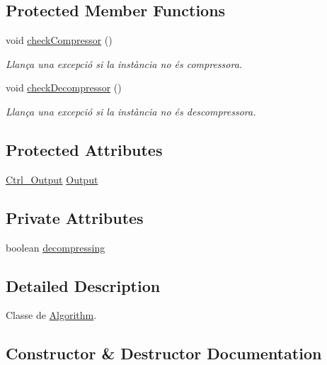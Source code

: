 \subsection*{Protected Member Functions}
\begin{DoxyCompactItemize}
\item 
void \hyperlink{classdomini_1_1algorithm_1_1Algorithm_a070b7e7dcc453b03751d265beae5306c}{check\+Compressor} ()
\begin{DoxyCompactList}\small\item\em Llança una excepció si la instància no és compressora. \end{DoxyCompactList}\item 
void \hyperlink{classdomini_1_1algorithm_1_1Algorithm_a6b738342cc7169893fa60d593f5a13db}{check\+Decompressor} ()
\begin{DoxyCompactList}\small\item\em Llança una excepció si la instància no és descompressora. \end{DoxyCompactList}\end{DoxyCompactItemize}
\subsection*{Protected Attributes}
\begin{DoxyCompactItemize}
\item 
\hyperlink{classpersistencia_1_1output_1_1Ctrl__Output}{Ctrl\+\_\+\+Output} \hyperlink{classdomini_1_1algorithm_1_1Algorithm_a4de9955411c656325adc391ef570c082}{Output}
\end{DoxyCompactItemize}
\subsection*{Private Attributes}
\begin{DoxyCompactItemize}
\item 
boolean \hyperlink{classdomini_1_1algorithm_1_1Algorithm_a0ec73147fb68a16e53801ea5da35b089}{decompressing}
\end{DoxyCompactItemize}


\subsection{Detailed Description}
Classe de \hyperlink{classdomini_1_1algorithm_1_1Algorithm}{Algorithm}. 

\subsection{Constructor \& Destructor Documentation}
\mbox{\label{classdomini_1_1algorithm_1_1Algorithm_a154c4e8cb723815bb8d8b5186ee93ec2}} 
